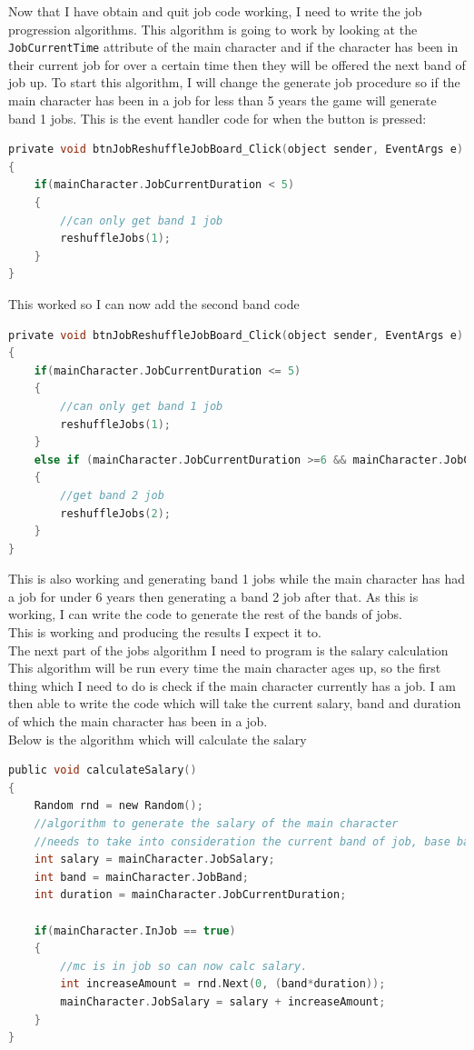 \noindent Now that I have obtain and quit job code working, I need to write the job progression algorithms. This algorithm is going to work by looking at the \verb|JobCurrentTime| attribute of the main character and if the character has been in their current job for over a certain time then they will be offered the next band of job up. To start this algorithm, I will change the generate job procedure so if the main character has been in a job for less than 5 years the game will generate band 1 jobs.
This is the event handler code for when the button is pressed:
\begin{lstlisting}[language=c, style=csharp, caption=Start of the Reshuffle Job Board algorithm]
private void btnJobReshuffleJobBoard_Click(object sender, EventArgs e)
{
    if(mainCharacter.JobCurrentDuration < 5)
    {
        //can only get band 1 job
        reshuffleJobs(1);
    }
}
\end{lstlisting}
This worked so I can now add the second band code
\begin{lstlisting}[language=c, style=csharp, caption=Second iteration of the reshuffle job board algorithm]
private void btnJobReshuffleJobBoard_Click(object sender, EventArgs e)
{
    if(mainCharacter.JobCurrentDuration <= 5)
    {
        //can only get band 1 job
        reshuffleJobs(1);
    }
    else if (mainCharacter.JobCurrentDuration >=6 && mainCharacter.JobCurrentDuration <= 14)
    {
        //get band 2 job
        reshuffleJobs(2);
    }
}
\end{lstlisting}
This is also working and generating band 1 jobs while the main character has had a job for under 6 years then generating a band 2 job after that. As this is working, I can write the code to generate the rest of the bands of jobs.\\
This is working and producing the results I expect it to.\\
The next part of the jobs algorithm I need to program is the salary calculation This algorithm will be run every time the main character ages up, so the first thing which I need to do is check if the main character currently has a job. I am then able to write the code which will take the current salary, band and duration of which the main character has been in a job. \\
Below is the algorithm which will calculate the salary
\begin{lstlisting}[language=c, style=csharp, caption=Calculate job salary algorithm]
public void calculateSalary()
{
    Random rnd = new Random();
    //algorithm to generate the salary of the main character
    //needs to take into consideration the current band of job, base band of that salary and how long the mc has been in that job
    int salary = mainCharacter.JobSalary;
    int band = mainCharacter.JobBand;
    int duration = mainCharacter.JobCurrentDuration;

    if(mainCharacter.InJob == true)
    {
        //mc is in job so can now calc salary.
        int increaseAmount = rnd.Next(0, (band*duration));
        mainCharacter.JobSalary = salary + increaseAmount;
    }
}
\end{lstlisting}
